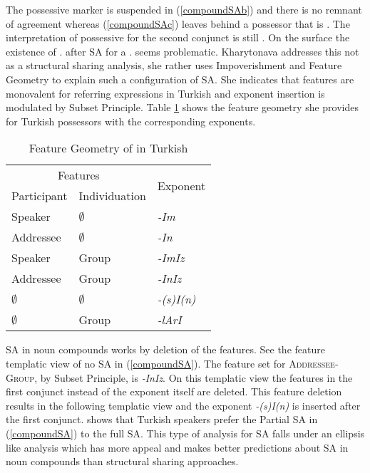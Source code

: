 The possessive marker is suspended in (\ref{compoundSAb}) and there is no remnant of agreement whereas (\ref{compoundSAc}) leaves behind a possessor that is {\Tsg}. The interpretation of possessive for the second conjunct is still {\Ssg}. On the surface the existence of {\Poss}.{\Tsg} after SA for a {\Poss}.{\Ssg} seems problematic. Kharytonava addresses this not as a structural sharing analysis, she rather uses Impoverishment and Feature Geometry to explain such a configuration of SA. She indicates that features are monovalent for referring expressions in Turkish and exponent insertion is modulated by Subset Principle. Table \ref{tab:kharyfeatures} shows the feature geometry she provides for Turkish possessors with the corresponding exponents.

\begin{table}[hbt!]
    \caption{Feature Geometry of {\Poss} in Turkish}
    \centering
    \begin{tabular}{|l|l|l|}
    \hline
         \multicolumn{2}{|c|}{Features} & \multirow{2}{*}{Exponent}  \\ \cline{1-2}
         Participant & Individuation  & \\ \hline
         Speaker & $\emptyset$ & \textit{-Im} \\ \hline 
         Addressee & $\emptyset$ & \textit{-In} \\ \hline 
         Speaker & Group & \textit{-ImIz} \\ \hline 
         Addressee & Group & \textit{-InIz} \\ \hline 
         $\emptyset$ & $\emptyset$ & \textit{-(s)I(n)} \\ \hline 
         $\emptyset$ & Group & \textit{-lArI} \\ \hline 
    \end{tabular}
    \label{tab:kharyfeatures}
\end{table}

SA in noun compounds works by deletion of the features. See the feature templatic view of no SA in (\ref{compoundSA}). The feature set for \textsc{Addressee}-\textsc{Group}, by Subset Principle, is \textit{-InIz}. On this templatic view the features in the first conjunct instead of the exponent itself are deleted. This feature deletion results in the following templatic view and the exponent \textit{-(s)I(n)} is inserted after the first conjunct. \cite{kharytonava2011morphology} shows that Turkish speakers prefer the Partial SA in (\ref{compoundSA}) to the full SA. This type of analysis for SA falls under an ellipsis like analysis which has more appeal and makes better predictions about SA in noun compounds than structural sharing approaches.

